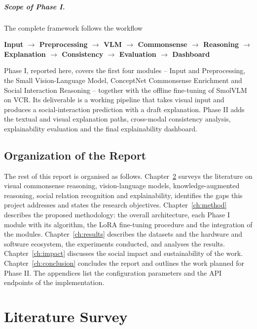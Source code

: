 \documentclass[12pt,a4paper,oneside]{report}
\begin{document}
\paragraph{Scope of Phase I.} The complete framework follows the workflow
\begin{center}
\small\textbf{Input $\rightarrow$ Preprocessing $\rightarrow$ VLM $\rightarrow$
Commonsense $\rightarrow$ Reasoning $\rightarrow$ Explanation $\rightarrow$
Consistency $\rightarrow$ Evaluation $\rightarrow$ Dashboard}
\end{center}
Phase I, reported here, covers the first four modules -- Input and
Preprocessing, the Small Vision-Language Model, ConceptNet Commonsense
Enrichment and Social Interaction Reasoning -- together with the offline
fine-tuning of SmolVLM on VCR. Its deliverable is a working pipeline that takes
visual input and produces a social-interaction prediction with a draft
explanation. Phase II adds the textual and visual explanation paths,
cross-modal consistency analysis, explainability evaluation and the final
explainability dashboard.

\section{Organization of the Report}

The rest of this report is organised as follows.
Chapter~\ref{ch:lit} surveys the literature on visual commonsense reasoning,
vision-language models, knowledge-augmented reasoning, social relation
recognition and explainability, identifies the gaps this project addresses and
states the research objectives.
Chapter~\ref{ch:method} describes the proposed methodology: the overall
architecture, each Phase I module with its algorithm, the LoRA fine-tuning
procedure and the integration of the modules.
Chapter~\ref{ch:results} describes the datasets and the hardware and software
ecosystem, the experiments conducted, and analyses the results.
Chapter~\ref{ch:impact} discusses the social impact and sustainability of the
work. Chapter~\ref{ch:conclusion} concludes the report and outlines the work
planned for Phase II. The appendices list the configuration parameters and the
API endpoints of the implementation.

\chapter{Literature Survey}
\label{ch:lit}
\end{document}
